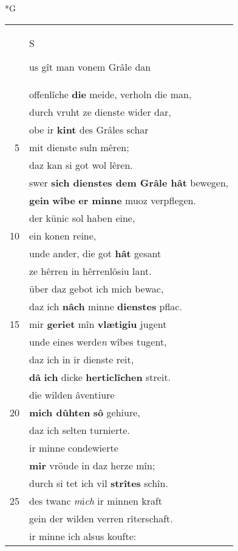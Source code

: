 \documentclass[8pt,a4paper,notitlepage]{article}
\begin{document}
\newpage
\begin{table}[ht]
\begin{minipage}[t]{0.5\linewidth}
\small
\begin{center}*G
\end{center}
\begin{tabular}{rl}
 & \begin{large}S\end{large}us gît man vonem Grâle dan\\ 
 & offenlîche \textbf{die} meide, verholn die man,\\ 
 & durch vruht ze dienste wider dar,\\ 
 & obe ir \textbf{kint} des Grâles schar\\ 
5 & mit dienste suln mêren;\\ 
 & daz kan si got wol lêren.\\ 
 & swer \textbf{sich dienstes dem Grâle hât} bewegen,\\ 
 & \textbf{gein} \textbf{wîbe} \textbf{er minne} muoz verpflegen.\\ 
 & der künic sol haben eine,\\ 
10 & ein konen reine,\\ 
 & unde ander, die got \textbf{hât} gesant\\ 
 & ze hêrren in hêrrenlôsiu lant.\\ 
 & über daz gebot ich mich bewac,\\ 
 & daz ich \textbf{nâch} minne \textbf{dienstes} pflac.\\ 
15 & mir \textbf{geriet} mîn \textbf{vlætigiu} jugent\\ 
 & unde eines werde\textit{n} wîbes tugent,\\ 
 & daz ich in ir dienste reit,\\ 
 & \textbf{dâ} \textbf{ich} dicke \textbf{herticlîchen} streit.\\ 
 & die wilden âventiure\\ 
20 & \textbf{mich dûhten} \textbf{sô} gehiure,\\ 
 & daz ich selten turnierte.\\ 
 & ir minne condewierte\\ 
 & \textbf{mir} vröude in daz herze mîn;\\ 
 & durch si tet ich vil \textbf{strîtes} schîn.\\ 
25 & des twanc \textit{m}i\textit{ch} ir minnen kraft\\ 
 & gein der wilden verren rîterschaft.\\ 
 & ir minne ich alsus koufte:\\ 

\end{tabular}
\end{minipage}
\end{table}
\end{document}
